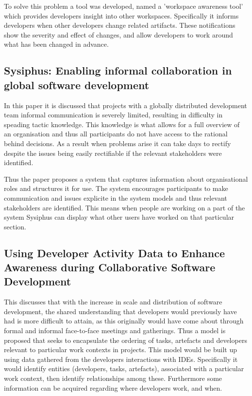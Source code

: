 \documentclass{l4proj}
\begin{document}
To solve this problem a tool was developed, named a 'workspace awareness tool' which provides developers insight into other workspaces.  Specifically it informs developers when other developers change related artifacts.  These notifications show the severity and effect of changes, and allow developers to work around what has been changed in advance.

\subsection {Sysiphus: Enabling informal collaboration in global software development}

In this paper it is discussed that projects with a globally distributed development team informal communication is severely limited, resulting in difficulty in speading tactic knowledge.  This knowledge is what allows for a full overview of an organisation and thus all participants do not have access to the rational behind decisions.  As a result when problems arise it can take days to rectify despite the issues being easily rectifiable if the relevant stakeholders were identified.

Thus the paper proposes a system that captures information about organisational roles and structures it for use.  The system encourages participants to make communication and issues explicite in the system models and thus relevant stakeholders are identified.  This means when people are working on a part of the system Sysiphus can display what other users have worked on that particular section.

\subsection {Using Developer Activity Data to Enhance Awareness during Collaborative Software Development}

This discusses that with the increase in scale and distribution of software development, the shared understanding that developers would previously have had is more difficult to attain, as this originally would have come about through formal and informal face-to-face meetings and gatherings.  Thus a model is proposed that seeks to encapsulate the ordering of tasks, artefacts and developers relevant to particular work contexts in projects.  This model would be built up using data gathered from the developers interactions with IDEs.  Specifically it would identify entities (developers, tasks, artefacts), associated with a particular work context, then identify relationships among these. Furthermore some information can be acquired regarding where developers work, and when.
\end{document}
